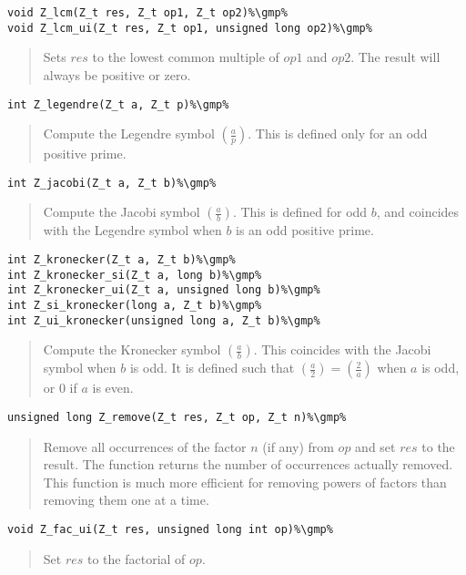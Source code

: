 \documentclass[a4paper,10pt]{article}
\newcommand{\gmp}{\hfill[GMP]}
\newcommand{\ljk}[2]{\left(\frac{#1}{#2}\right)}
\begin{document}
\begin{lstlisting}
void Z_lcm(Z_t res, Z_t op1, Z_t op2)%\gmp%
void Z_lcm_ui(Z_t res, Z_t op1, unsigned long op2)%\gmp%
\end{lstlisting}
\begin{quote}Sets $res$ to the lowest common multiple of $op1$ and $op2$. The result will always be positive or zero.\end{quote}

\begin{lstlisting}
int Z_legendre(Z_t a, Z_t p)%\gmp%
\end{lstlisting}
\begin{quote}Compute the Legendre symbol $\ljk{a}{p}$. This is defined only for an odd positive prime.\end{quote}

\begin{lstlisting}
int Z_jacobi(Z_t a, Z_t b)%\gmp%
\end{lstlisting}
\begin{quote}Compute the Jacobi symbol $\ljk{a}{b}$. This is defined for odd $b$, and coincides with the Legendre symbol when $b$ is an odd positive prime.\end{quote}

\begin{lstlisting}
int Z_kronecker(Z_t a, Z_t b)%\gmp%
int Z_kronecker_si(Z_t a, long b)%\gmp%
int Z_kronecker_ui(Z_t a, unsigned long b)%\gmp%
int Z_si_kronecker(long a, Z_t b)%\gmp%
int Z_ui_kronecker(unsigned long a, Z_t b)%\gmp%
\end{lstlisting}
\begin{quote}Compute the Kronecker symbol $\ljk{a}{b}$. This coincides with the Jacobi symbol when $b$ is odd. It is defined such that $\ljk{a}{2} = \ljk{2}{a}$ when $a$ is odd, or 0 if $a$ is even.\end{quote}

\begin{lstlisting}
unsigned long Z_remove(Z_t res, Z_t op, Z_t n)%\gmp%
\end{lstlisting}
\begin{quote}Remove all occurrences of the factor $n$ (if any) from $op$ and set $res$ to the result. The function returns the number of occurrences actually removed. This function is much more efficient for removing powers of factors than removing them one at a time.\end{quote}

\begin{lstlisting}
void Z_fac_ui(Z_t res, unsigned long int op)%\gmp%
\end{lstlisting}
\begin{quote}Set $res$ to the factorial of $op$.\end{quote}
\end{document}
